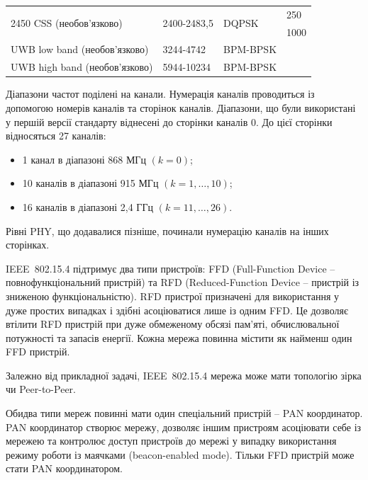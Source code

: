 \documentclass[a4paper,ukrainian,utf8,nocolumnsxix,floatsection,equationsection]{eskdtext}
\newcommand{\iee}[0]{IEEE~802.15.4\xspace}
\begin{document}
\begin{table}[htbp]
\begin{tabular}{|p{}|p{}|p{}|p{}|}
		\multirow{2}{*}{2450 CSS (необов’язково)} & \multirow{2}{*}{2400-2483,5} & \multirow{2}{*}{DQPSK} & 250                         \\ \cline{ 4- 4}
		                                          &                              &                        & 1000                        \\ \hline
		UWB low band (необов’язково)              & 3244-4742                    & BPM-BPSK               &                             \\ \hline
		UWB high band (необов’язково)             & 5944-10234                   & BPM-BPSK               &                             \\ \hline
	\end{tabular}
	\label{tbl:supported:phy:iee}
\end{table}


Діапазони частот поділені на канали. Нумерація каналів проводиться із допомогою номерів каналів та сторінок каналів. Діапазони, що були використані у першій версії стандарту віднесені до сторінки каналів 0. До цієї сторінки відносяться 27 каналів: 
\begin{itemize}
	\item 1 канал в діапазоні 868 МГц $(k = 0)$;
	\item 10 каналів в діапазоні 915 МГц $(k = 1, \dots, 10)$;
	\item 16 каналів в діапазоні 2,4 ГГц $(k = 11, \dots, 26)$.
\end{itemize}

Рівні PHY, що додавалися пізніше, починали нумерацію каналів на інших сторінках.

\iee підтримує два типи пристроїв: FFD (Full-Function Device – повнофункціональний пристрій) та RFD (Reduced-Function Device – пристрій із зниженою функціональністю). RFD пристрої призначені для використання у дуже простих випадках і здібні асоціюватися лише із одним FFD. Це дозволяє втілити RFD пристрій при дуже обмеженому обсязі пам’яті, обчислювальної потужності та запасів енергії. Кожна мережа повинна містити як найменш один FFD пристрій. 

Залежно від прикладної задачі, \iee мережа може мати топологію зірка чи Peer-to-Peer. 

Обидва типи мереж повинні мати один спеціальний пристрій – PAN координатор. PAN координатор створює мережу, дозволяє іншим пристроям асоціювати себе із мережею та контролює доступ пристроїв до мережі у випадку використання режиму роботи із маячками (beacon-enabled mode). Тільки FFD пристрій може стати PAN координатором.
\end{document}

